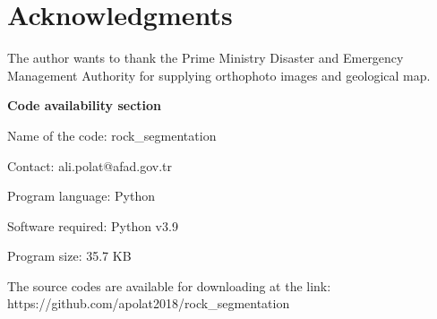 \documentclass[a4paper,fleqn]{cas-sc}
\begin{document}
\section{Acknowledgments}

The author wants to thank the Prime Ministry Disaster and Emergency Management Authority for supplying orthophoto images and geological map.

\newpage

\textbf{Code availability section}

Name of the code: rock\_segmentation

Contact: ali.polat@afad.gov.tr

Program language: Python
 
Software required: Python v3.9

Program size: 35.7 KB

The source codes are available for downloading at the link:
https://github.com/apolat2018/rock\_segmentation



 
\end{document}
